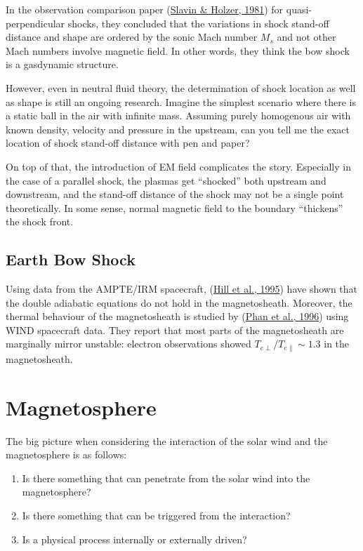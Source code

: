 \documentclass[
  notoc %
]{tufte-book}
\providecommand{\tightlist}{%
  \setlength{\itemsep}{0pt}\setlength{\parskip}{0pt}
}
\begin{document}
In the observation comparison paper
(\protect\hyperlink{ref-slavin1981solar}{Slavin \& Holzer, 1981}) for
quasi-perpendicular shocks, they concluded that the variations in shock
stand-off distance and shape are ordered by the sonic Mach number
\(M_s\) and not other Mach numbers involve magnetic field. In other
words, they think the bow shock is a gasdynamic structure.

However, even in neutral fluid theory, the determination of shock
location as well as shape is still an ongoing research. Imagine the
simplest scenario where there is a static ball in the air with infinite
mass. Assuming purely homogenous air with known density, velocity and
pressure in the upstream, can you tell me the exact location of shock
stand-off distance with pen and paper?

On top of that, the introduction of EM field complicates the story.
Especially in the case of a parallel shock, the plasmas get ``shocked''
both upstream and downstream, and the stand-off distance of the shock
may not be a single point theoretically. In some sense, normal magnetic
field to the boundary ``thickens'' the shock front.

\hypertarget{earth-bow-shock}{%
\section{Earth Bow Shock}\label{earth-bow-shock}}

Using data from the AMPTE/IRM spacecraft,
(\protect\hyperlink{ref-hill1995plasma}{Hill et al., 1995}) have shown
that the double adiabatic equations do not hold in the magnetosheath.
Moreover, the thermal behaviour of the magnetosheath is studied by
(\protect\hyperlink{ref-phan1996subsolar}{Phan et al., 1996}) using WIND
spacecraft data. They report that most parts of the magnetosheath are
marginally mirror unstable: electron observations showed
\(T_{e\perp} / T_{e\parallel} \sim 1.3\) in the magnetosheath.

\hypertarget{sec:magnetosphere}{%
\chapter{Magnetosphere}\label{sec:magnetosphere}}

The big picture when considering the interaction of the solar wind and
the magnetosphere is as follows:

\begin{enumerate}
\def\labelenumi{\arabic{enumi}.}
\tightlist
\item
  Is there something that can penetrate from the solar wind into the
  magnetosphere?
\item
  Is there something that can be triggered from the interaction?
\item
  Is a physical process internally or externally driven?
\end{enumerate}
\end{document}
